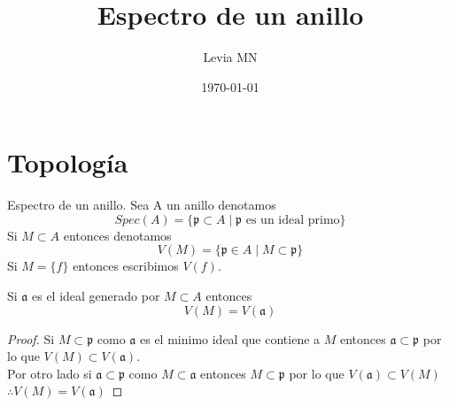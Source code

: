 \documentclass{article}
\title{Espectro de un anillo}
\author{Levia MN}
\date{\today}
\begin{document}
\maketitle
\section{Topología}

\begin{definicion}{Espectro de un anillo.}{}
    Sea A un anillo denotamos 
    $$Spec(A)=\{\mathfrak{p} \subset A \mid \mathfrak{p} \mbox{ es un ideal primo} \}$$
    Si $M \subset A$ entonces denotamos 
    $$V(M) = \{\mathfrak{p} \in A \mid M \subset \mathfrak{p}\}$$
    Si $M=\{f\}$ entonces escribimos $V(f)$.
\end{definicion}

\begin{observacion}{}{}
    Si $\mathfrak{a}$ es el ideal generado por $M \subset A$ entonces
    $$V(M) = V(\mathfrak{a})$$
\end{observacion}
\begin{proof}
    Si $M \subset \mathfrak{p}$ como $\mathfrak{a}$ es el minimo
    ideal que contiene a $M$ entonces $\mathfrak{a} \subset \mathfrak{p}$
    por lo que $V(M) \subset V(\mathfrak{a})$.
    \\
    Por otro lado si $\mathfrak{a} \subset \mathfrak{p}$ como
    $M \subset \mathfrak{a}$ entonces $M \subset \mathfrak{p}$
    por lo que $V(\mathfrak{a}) \subset V(M)$
    \\
    $\therefore V(M) = V(\mathfrak{a})$
\end{proof}
\end{document}
